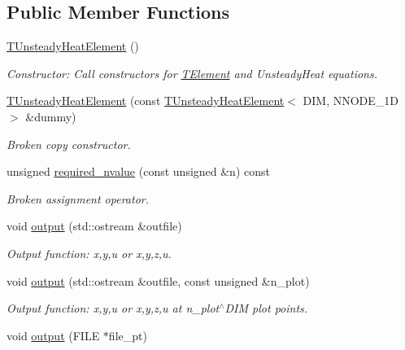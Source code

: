 \subsection*{Public Member Functions}
\begin{DoxyCompactItemize}
\item 
\hyperlink{classoomph_1_1TUnsteadyHeatElement_a1ef76545b77561b462358a593d829844}{T\+Unsteady\+Heat\+Element} ()
\begin{DoxyCompactList}\small\item\em Constructor\+: Call constructors for \hyperlink{classoomph_1_1TElement}{T\+Element} and Unsteady\+Heat equations. \end{DoxyCompactList}\item 
\hyperlink{classoomph_1_1TUnsteadyHeatElement_a151aad04a5236dc5cf86576b179278c8}{T\+Unsteady\+Heat\+Element} (const \hyperlink{classoomph_1_1TUnsteadyHeatElement}{T\+Unsteady\+Heat\+Element}$<$ D\+IM, N\+N\+O\+D\+E\+\_\+1D $>$ \&dummy)
\begin{DoxyCompactList}\small\item\em Broken copy constructor. \end{DoxyCompactList}\item 
unsigned \hyperlink{classoomph_1_1TUnsteadyHeatElement_af3e705367ab5d37d0016ad00a8b81592}{required\+\_\+nvalue} (const unsigned \&n) const
\begin{DoxyCompactList}\small\item\em Broken assignment operator. \end{DoxyCompactList}\item 
void \hyperlink{classoomph_1_1TUnsteadyHeatElement_a03456d7b303e01a92f634a99fad1eacf}{output} (std\+::ostream \&outfile)
\begin{DoxyCompactList}\small\item\em Output function\+: x,y,u or x,y,z,u. \end{DoxyCompactList}\item 
void \hyperlink{classoomph_1_1TUnsteadyHeatElement_a2602a84d853cda483fd52abadb524da9}{output} (std\+::ostream \&outfile, const unsigned \&n\+\_\+plot)
\begin{DoxyCompactList}\small\item\em Output function\+: x,y,u or x,y,z,u at n\+\_\+plot$^\wedge$\+D\+IM plot points. \end{DoxyCompactList}\item 
void \hyperlink{classoomph_1_1TUnsteadyHeatElement_a278bcf1033d234317dd3a0f8ed306e89}{output} (F\+I\+LE $\ast$file\+\_\+pt)

\end{DoxyCompactItemize}

